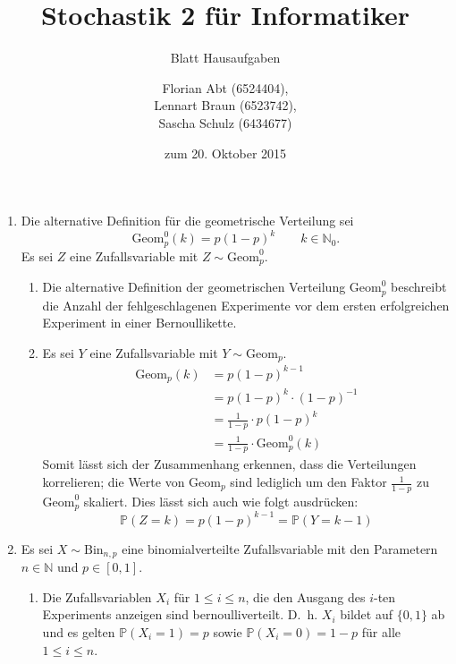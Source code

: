 \documentclass[a4paper]{scrartcl}
\title{Stochastik 2 für Informatiker}
\subtitle{Blatt \blattnr Hausaufgaben}
\author{
    Florian Abt (6524404), \\
    Lennart Braun (6523742), \\
    Sascha Schulz (6434677)
}
\date{zum 20. Oktober 2015}
\newcommand{\prob}{\mathbb{P}}
\begin{document}
\maketitle

\begin{enumerate}[label=\bfseries 1.\arabic*]
    \item
        Die alternative Definition für die geometrische Verteilung sei
        \begin{equation*}
            \text{Geom}_p^0(k) = p(1-p)^k \qquad k \in \mathbb{N}_0 \text{.}
        \end{equation*}
        Es sei $Z$ eine Zufallsvariable mit $Z \sim \text{Geom}_p^0$.
        \begin{enumerate}[label=\alph*)]
            \item
                Die alternative Definition der geometrischen Verteilung
                $\text{Geom}_p^0$ beschreibt die Anzahl der fehlgeschlagenen
                Experimente vor dem ersten erfolgreichen Experiment in einer
                Bernoullikette.

            \item
                Es sei $Y$ eine Zufallsvariable mit $Y \sim \text{Geom}_p$.              
                \begin{equation*}
                    \begin{split}
                        \text{Geom}_p(k)
                        &= p(1-p)^{k-1} \\
                        &= p(1-p)^k \cdot (1-p)^{-1} \\
                        &= \frac{1}{1-p} \cdot p(1-p)^k \\
                        &= \frac{1}{1-p} \cdot \text{Geom}_p^0(k)
                    \end{split}
                \end{equation*}
                Somit lässt sich der Zusammenhang erkennen, dass die
                Verteilungen korrelieren; die Werte von $\text{Geom}_p$ sind
                lediglich um den Faktor $\frac1{1-p}$ zu $\text{Geom}_p^0$
                skaliert.  Dies lässt sich auch wie folgt ausdrücken:
                \begin{equation*}
                    \prob(Z=k) = p(1-p)^{k-1} = \prob(Y=k-1)
                \end{equation*}
        \end{enumerate}

    \item
        Es sei $X \sim \text{Bin}_{n,p}$ eine binomialverteilte Zufallsvariable
        mit den Parametern $n \in \mathbb{N}$ und $p \in [0,1]$.
        \begin{enumerate}[label=\alph*)]
            \item
                Die Zufallsvariablen $X_i$ für $1 \leq i \leq n$, die den
                Ausgang des $i$-ten Experiments anzeigen sind
                bernoulliverteilt.  D.~h. $X_i$ bildet auf $\{0,1\}$ ab und es
                gelten $\prob(X_i=1) = p$ sowie $\prob(X_i=0) = 1-p$
                für alle $1 \leq i \leq n$.


\end{enumerate}
\end{enumerate}
\end{document}
